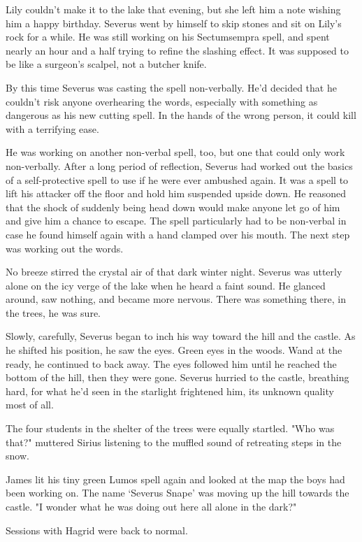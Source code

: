 Lily couldn't make it to the lake that evening, but she left him a note wishing him a happy birthday. Severus went by himself to skip stones and sit on Lily's rock for a while. He was still working on his Sectumsempra spell, and spent nearly an hour and a half trying to refine the slashing effect. It was supposed to be like a surgeon's scalpel, not a butcher knife.

By this time Severus was casting the spell non-verbally. He'd decided that he couldn't risk anyone overhearing the words, especially with something as dangerous as his new cutting spell. In the hands of the wrong person, it could kill with a terrifying ease.

He was working on another non-verbal spell, too, but one that could only work non-verbally. After a long period of reflection, Severus had worked out the basics of a self-protective spell to use if he were ever ambushed again. It was a spell to lift his attacker off the floor and hold him suspended upside down. He reasoned that the shock of suddenly being head down would make anyone let go of him and give him a chance to escape. The spell particularly had to be non-verbal in case he found himself again with a hand clamped over his mouth. The next step was working out the words.

No breeze stirred the crystal air of that dark winter night. Severus was utterly alone on the icy verge of the lake when he heard a faint{\el} sound. He glanced around, saw nothing, and became more nervous. There was something there, in the trees, he was sure.

Slowly, carefully, Severus began to inch his way toward the hill and the castle. As he shifted his position, he saw the eyes. Green eyes in the woods. Wand at the ready, he continued to back away. The eyes followed him until he reached the bottom of the hill, then they were gone. Severus hurried to the castle, breathing hard, for what he'd seen in the starlight frightened him, its unknown quality most of all.

The four students in the shelter of the trees were equally startled. "Who was that?" muttered Sirius listening to the muffled sound of retreating steps in the snow.

James lit his tiny green Lumos spell again and looked at the map the boys had been working on. The name `Severus Snape' was moving up the hill towards the castle. "I wonder what he was doing out here all alone in the dark?"

Sessions with Hagrid were back to normal.

